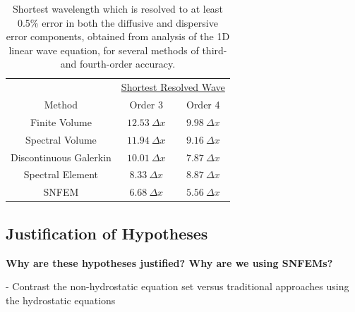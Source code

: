 \documentclass[11pt]{article}
\begin{document}
\begin{table}
\begin{center}
\begin{tabular}{ccc}
\hline & \multicolumn{2}{c}{\underline{Shortest Resolved Wave}} \\
Method & Order 3 & Order 4 \\
\hline \hline Finite Volume & $12.53\ \Delta x$ & $9.98\ \Delta x$ \\
Spectral Volume & $11.94\ \Delta x$ & $9.16\ \Delta x$ \\
Discontinuous Galerkin & $10.01\ \Delta x$ & $7.87\ \Delta x$ \\
Spectral Element & $8.33\ \Delta x$ & $8.87\ \Delta x$ \\
SNFEM & $6.68\ \Delta x$ & $5.56\ \Delta x$ \\
\hline
\end{tabular}
\end{center}
\caption{Shortest wavelength which is resolved to at least 0.5\% error in both the diffusive and dispersive error components, obtained from analysis of the 1D linear wave equation, for several methods of third- and fourth-order accuracy.} \label{tab:ShortestResolvedWave}
\end{table}

\subsection{Justification of Hypotheses}

\textbf{Why are these hypotheses justified?  Why are we using SNFEMs?}

- Contrast the non-hydrostatic equation set versus traditional approaches using the hydrostatic equations
\end{document}
